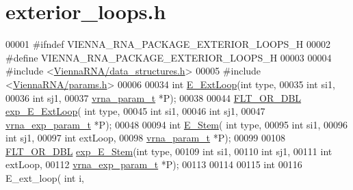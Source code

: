\hypertarget{exterior__loops_8h_source}{}\section{exterior\+\_\+loops.\+h}
\label{exterior__loops_8h_source}

\begin{DoxyCode}
00001 \textcolor{preprocessor}{#ifndef VIENNA\_RNA\_PACKAGE\_EXTERIOR\_LOOPS\_H}
00002 \textcolor{preprocessor}{#define VIENNA\_RNA\_PACKAGE\_EXTERIOR\_LOOPS\_H}
00003 
00004 \textcolor{preprocessor}{#include <\hyperlink{data__structures_8h}{ViennaRNA/data\_structures.h}>}
00005 \textcolor{preprocessor}{#include <\hyperlink{params_8h}{ViennaRNA/params.h}>}
00006 
00034 \textcolor{keywordtype}{int} \hyperlink{group__loops_ga05c6288c5a79d3bd5ad6d33c1bb34bd0}{E\_ExtLoop}(\textcolor{keywordtype}{int} type,
00035               \textcolor{keywordtype}{int} si1,
00036               \textcolor{keywordtype}{int} sj1,
00037               \hyperlink{group__energy__parameters_structvrna__param__s}{vrna\_param\_t} *P);
00038 
00044 \hyperlink{group__data__structures_ga31125aeace516926bf7f251f759b6126}{FLT\_OR\_DBL} \hyperlink{group__loops_ga446828a191c127861e76e2c84055f672}{exp\_E\_ExtLoop}( \textcolor{keywordtype}{int} type,
00045                       \textcolor{keywordtype}{int} si1,
00046                       \textcolor{keywordtype}{int} sj1,
00047                       \hyperlink{group__energy__parameters_structvrna__exp__param__s}{vrna\_exp\_param\_t} *P);
00048 
00094 \textcolor{keywordtype}{int} \hyperlink{group__loops_ga51f9851f3500c2aae66674142a6a2dd5}{E\_Stem}( \textcolor{keywordtype}{int} type,
00095             \textcolor{keywordtype}{int} si1,
00096             \textcolor{keywordtype}{int} sj1,
00097             \textcolor{keywordtype}{int} extLoop,
00098             \hyperlink{group__energy__parameters_structvrna__param__s}{vrna\_param\_t} *P);
00099 
00108 \hyperlink{group__data__structures_ga31125aeace516926bf7f251f759b6126}{FLT\_OR\_DBL} \hyperlink{group__loops_gab0aa9833ab41875a91a9be8a5ffd7092}{exp\_E\_Stem}(\textcolor{keywordtype}{int} type,
00109                   \textcolor{keywordtype}{int} si1,
00110                   \textcolor{keywordtype}{int} sj1,
00111                   \textcolor{keywordtype}{int} extLoop,
00112                   \hyperlink{group__energy__parameters_structvrna__exp__param__s}{vrna\_exp\_param\_t} *P);
00113 
00114 
00115 \textcolor{keywordtype}{int}
00116 E\_ext\_loop( \textcolor{keywordtype}{int} i,

\end{DoxyCode}

